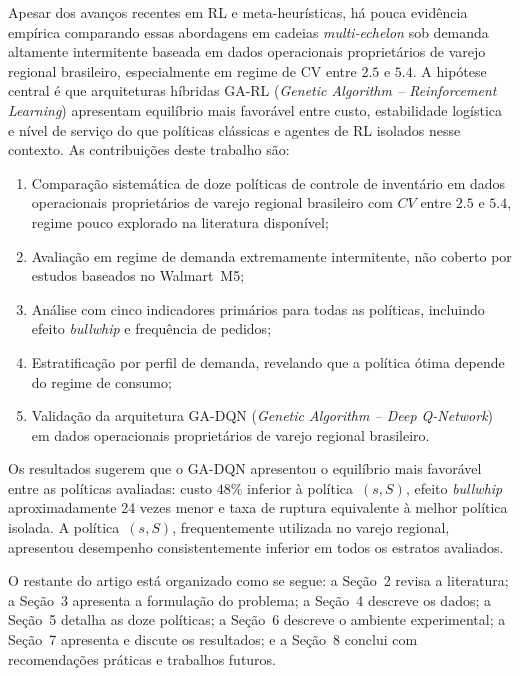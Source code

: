 \documentclass[a4paper,11pt]{article}
\begin{document}
Apesar dos avanços recentes em RL e meta-heurísticas, há pouca
evidência empírica comparando essas abordagens em cadeias
\textit{multi-echelon} sob demanda altamente intermitente baseada
em dados operacionais proprietários de varejo regional brasileiro,
especialmente em regime de CV entre $2.5$ e $5.4$.
A hipótese central é que arquiteturas híbridas
GA-RL (\textit{Genetic Algorithm -- Reinforcement Learning})
apresentam equilíbrio mais favorável entre custo, estabilidade
logística e nível de serviço do que políticas clássicas e agentes
de RL isolados nesse contexto. As contribuições deste trabalho são:

\begin{enumerate}
  \item Comparação sistemática de doze políticas de controle
    de inventário em dados operacionais proprietários de varejo
    regional brasileiro com $CV$ entre $2.5$ e $5.4$, regime
    pouco explorado na literatura disponível;
  \item Avaliação em regime de demanda extremamente intermitente,
    não coberto por estudos baseados no Walmart~M5;
  \item Análise com cinco indicadores primários para todas as
    políticas, incluindo efeito \textit{bullwhip} e frequência
    de pedidos;
  \item Estratificação por perfil de demanda, revelando que a
    política ótima depende do regime de consumo;
  \item Validação da arquitetura GA-DQN
    (\textit{Genetic Algorithm -- Deep Q-Network}) em dados
    operacionais proprietários de varejo regional brasileiro.
\end{enumerate}

Os resultados sugerem que o GA-DQN apresentou o equilíbrio mais
favorável entre as políticas avaliadas: custo $48\%$ inferior à
política~$(s,S)$, efeito \textit{bullwhip} aproximadamente 24
vezes menor e taxa de ruptura equivalente à melhor política
isolada. A política~$(s,S)$, frequentemente utilizada no varejo
regional, apresentou desempenho consistentemente inferior em todos
os estratos avaliados.

O restante do artigo está organizado como se segue: a Seção~2
revisa a literatura; a Seção~3 apresenta a formulação do problema;
a Seção~4 descreve os dados; a Seção~5 detalha as doze políticas;
a Seção~6 descreve o ambiente experimental; a Seção~7 apresenta e
discute os resultados; e a Seção~8 conclui com recomendações
práticas e trabalhos futuros.
\end{document}
